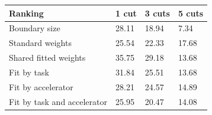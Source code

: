 \begin{tabular}{@{}llll@{}}
\toprule
Ranking & 1 cut & 3 cuts & 5 cuts \\
\midrule
Boundary size & 28.11 & 18.94 & 7.34 \\
Standard weights & 25.54 & 22.33 & 17.68 \\
Shared fitted weights & 35.75 & 29.18 & 13.68 \\
Fit by task & 31.84 & 25.51 & 13.68 \\
Fit by accelerator & 28.21 & 24.57 & 14.89 \\
Fit by task and accelerator & 25.95 & 20.47 & 14.08 \\
\bottomrule
\end{tabular}
